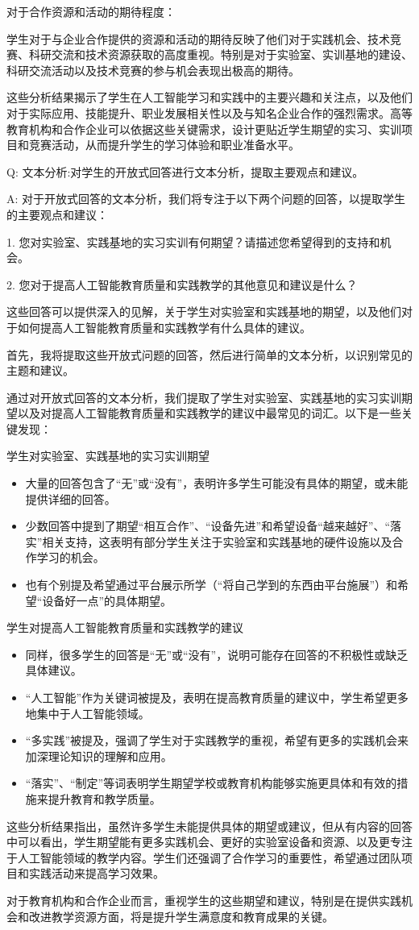 对于合作资源和活动的期待程度：

学生对于与企业合作提供的资源和活动的期待反映了他们对于实践机会、技术竞赛、科研交流和技术资源获取的高度重视。特别是对于实验室、实训基地的建设、科研交流活动以及技术竞赛的参与机会表现出极高的期待。

这些分析结果揭示了学生在人工智能学习和实践中的主要兴趣和关注点，以及他们对于实际应用、技能提升、职业发展相关性以及与知名企业合作的强烈需求。高等教育机构和合作企业可以依据这些关键需求，设计更贴近学生期望的实习、实训项目和竞赛活动，从而提升学生的学习体验和职业准备水平。

Q:
  文本分析:对学生的开放式回答进行文本分析，提取主要观点和建议。

A:
对于开放式回答的文本分析，我们将专注于以下两个问题的回答，以提取学生的主要观点和建议：

1. 您对实验室、实践基地的实习实训有何期望？请描述您希望得到的支持和机会。

2. 您对于提高人工智能教育质量和实践教学的其他意见和建议是什么？

这些回答可以提供深入的见解，关于学生对实验室和实践基地的期望，以及他们对于如何提高人工智能教育质量和实践教学有什么具体的建议。

首先，我将提取这些开放式问题的回答，然后进行简单的文本分析，以识别常见的主题和建议。

通过对开放式回答的文本分析，我们提取了学生对实验室、实践基地的实习实训期望以及对提高人工智能教育质量和实践教学的建议中最常见的词汇。以下是一些关键发现：

学生对实验室、实践基地的实习实训期望
\begin{itemize}
\item 大量的回答包含了“无”或“没有”，表明许多学生可能没有具体的期望，或未能提供详细的回答。
\item 少数回答中提到了期望“相互合作”、“设备先进”和希望设备“越来越好”、“落实”相关支持，这表明有部分学生关注于实验室和实践基地的硬件设施以及合作学习的机会。
\item 也有个别提及希望通过平台展示所学（“将自己学到的东西由平台施展”）和希望“设备好一点”的具体期望。
\end{itemize}

学生对提高人工智能教育质量和实践教学的建议
\begin{itemize}
\item 同样，很多学生的回答是“无”或“没有”，说明可能存在回答的不积极性或缺乏具体建议。
\item  “人工智能”作为关键词被提及，表明在提高教育质量的建议中，学生希望更多地集中于人工智能领域。
\item  “多实践”被提及，强调了学生对于实践教学的重视，希望有更多的实践机会来加深理论知识的理解和应用。
\item “落实”、“制定”等词表明学生期望学校或教育机构能够实施更具体和有效的措施来提升教育和教学质量。
\end{itemize}

这些分析结果指出，虽然许多学生未能提供具体的期望或建议，但从有内容的回答中可以看出，学生期望能有更多实践机会、更好的实验室设备和资源、以及更专注于人工智能领域的教学内容。学生们还强调了合作学习的重要性，希望通过团队项目和实践活动来提高学习效果。

对于教育机构和合作企业而言，重视学生的这些期望和建议，特别是在提供实践机会和改进教学资源方面，将是提升学生满意度和教育成果的关键。
